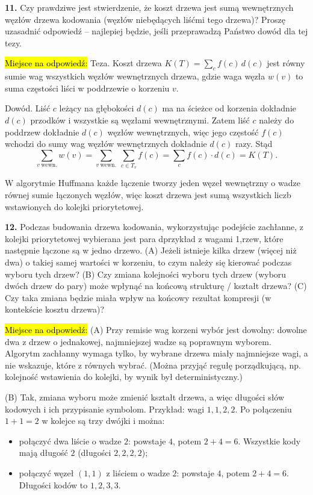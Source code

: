 \documentclass[twoside]{article}
\begin{document}
\textbf{11.} Czy prawdziwe jest stwierdzenie, że koszt drzewa jest sumą wewnętrznych węzłów drzewa kodowania
(węzłów niebędących liśćmi tego drzewa)? 
Proszę uzasadnić odpowiedź -- najlepiej będzie, jeśli przeprawadzą Państwo dowód dla tej tezy.

\hl{Miejsce na odpowiedź:}
Teza. Koszt drzewa $K(T)=\sum_{c} f(c)\,d(c)$ jest równy sumie wag wszystkich węzłów wewnętrznych drzewa, gdzie waga węzła $w(v)$ to suma częstości liści w poddrzewie o korzeniu $v$.

Dowód. Liść $c$ leżący na głębokości $d(c)$ ma na ścieżce od korzenia dokładnie $d(c)$ przodków i wszystkie są węzłami wewnętrznymi. Zatem liść $c$ należy do poddrzew dokładnie $d(c)$ węzłów wewnętrznych, więc jego częstość $f(c)$ wchodzi do sumy wag węzłów wewnętrznych dokładnie $d(c)$ razy. Stąd
\[
  \sum_{v\ \text{wewn.}} w(v)
  = \sum_{v\ \text{wewn.}} \ \sum_{c \in T_v} f(c)
  = \sum_{c} f(c)\cdot d(c)
  = K(T).
\]

W algorytmie Huffmana każde łączenie tworzy jeden węzeł wewnętrzny o wadze równej sumie łączonych węzłów, więc koszt drzewa jest sumą wszystkich liczb wstawionych do kolejki priorytetowej.
\newline

\textbf{12.} Podczas budowania drzewa kodowania, wykorzystując podejście zachłanne, z kolejki priorytetowej
wybierana jest para dprzykład z wagami 1,rzew, które następnie łączone są w jedno drzewo.
(A) Jeżeli istnieje kilka drzew (więcej niż dwa) o takiej samej wartości w korzeniu, to czym należy się 
kierować podczas wyboru tych drzew?
(B) Czy zmiana kolejności wyboru tych drzew (wyboru dwóch drzew do pary) może wpłynąć na końcową 
strukturę / kształt drzewa?
(C) Czy taka zmiana będzie miała wpływ na końcowy rezultat kompresji (w kontekście kosztu drzewa)?

\hl{Miejsce na odpowiedź:}
(A) Przy remisie wag korzeni wybór jest dowolny: dowolne dwa z drzew o jednakowej, najmniejszej wadze są poprawnym wyborem. Algorytm zachłanny wymaga tylko, by wybrane drzewa miały najmniejsze wagi, a nie wskazuje, które z równych wybrać. (Można przyjąć regułę porządkującą, np. kolejność wstawienia do kolejki, by wynik był deterministyczny.)

(B) Tak, zmiana wyboru może zmienić kształt drzewa, a więc długości słów kodowych i ich przypisanie symbolom. Przykład: wagi $1,1,2,2$. Po połączeniu $1+1=2$ w kolejce są trzy dwójki i można:
\begin{itemize}
  \item połączyć dwa liście o wadze $2$: powstaje $4$, potem $2+4=6$. Wszystkie kody mają długość $2$ (długości $2,2,2,2$);
  \item połączyć węzeł $(1,1)$ z liściem o wadze $2$: powstaje $4$, potem $2+4=6$. Długości kodów to $1,2,3,3$.
\end{itemize}
\end{document}
